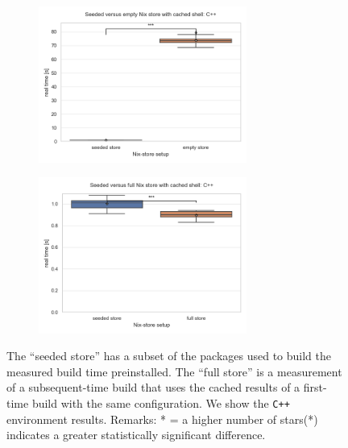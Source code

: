 \begin{figure}
    \centering
    \begin{subfigure}{\textwidth}
        \centering
      \includegraphics[width=0.75\textwidth]{thesis/graphics/nsar-plots/seeded_versus_empty_nix_store_with_cached_shell:_c++.png}
      \caption{}
      \label{fig:nsar-seeded-vs-empty-store-cpp}
    \end{subfigure}
    \begin{subfigure}{\textwidth}
    \centering
      \includegraphics[width=0.75\textwidth]{thesis/graphics/nsar-plots/seeded_versus_full_nix_store_with_cached_shell:_c++.png}
      \caption{}
      \label{fig:nsar-seeded-vs-full-store-cpp}
    \end{subfigure} 
    \caption{The ``seeded store'' has a subset of the packages used to build the measured build time preinstalled. The ``full store'' is a measurement of a subsequent-time build that uses the cached results of a first-time build with the same configuration. We show the \texttt{C++} environment results. Remarks: * = a higher number of stars(*) indicates a greater statistically significant difference.}
    \label{fig:nsar-seeded}
\end{figure}


